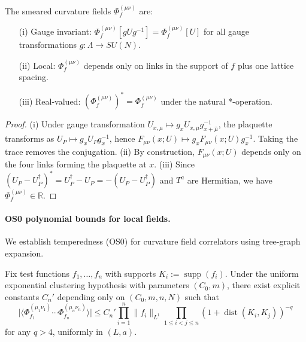 \documentclass[11pt]{amsart}
\begin{document}
\begin{proposition}\label{prop:curvature-local}
The smeared curvature fields $\Phi_f^{(\mu\nu)}$ are:
\begin{itemize}
  \item[(i)] Gauge invariant: $\Phi_f^{(\mu\nu)}[gUg^{-1}] = \Phi_f^{(\mu\nu)}[U]$ for all gauge transformations $g:\Lambda\to SU(N)$.
  \item[(ii)] Local: $\Phi_f^{(\mu\nu)}$ depends only on links in the support of $f$ plus one lattice spacing.
  \item[(iii)] Real-valued: $(\Phi_f^{(\mu\nu)})^* = \Phi_f^{(\mu\nu)}$ under the natural *-operation.
\end{itemize}
\end{proposition}

\begin{proof}
(i) Under gauge transformation $U_{x,\mu} \mapsto g_x U_{x,\mu} g_{x+\hat\mu}^{-1}$, the plaquette transforms as $U_P \mapsto g_x U_P g_x^{-1}$, hence $F_{\mu\nu}(x;U) \mapsto g_x F_{\mu\nu}(x;U) g_x^{-1}$. Taking the trace removes the conjugation.
(ii) By construction, $F_{\mu\nu}(x;U)$ depends only on the four links forming the plaquette at $x$.
(iii) Since $(U_P - U_P^\dagger)^* = U_P^\dagger - U_P = -(U_P - U_P^\dagger)$ and $T^a$ are Hermitian, we have $\Phi_f^{(\mu\nu)} \in \mathbb{R}$.
\end{proof}

\paragraph{OS0 polynomial bounds for local fields.}
We establish temperedness (OS0) for curvature field correlators using tree-graph expansion.

\begin{theorem}\label{thm:os0-curvature}
Fix test functions $f_1,\ldots,f_n$ with supports $K_i := \operatorname{supp}(f_i)$. Under the uniform exponential clustering hypothesis with parameters $(C_0,m)$, there exist explicit constants $C_n'$ depending only on $(C_0,m,n,N)$ such that
\[
  \bigl|\langle \Phi_{f_1}^{(\mu_1\nu_1)} \cdots \Phi_{f_n}^{(\mu_n\nu_n)} \rangle\bigr| \le C_n' \prod_{i=1}^n \|f_i\|_{L^1} \prod_{1\le i<j\le n} (1+\operatorname{dist}(K_i,K_j))^{-q}
\]
for any $q > 4$, uniformly in $(L,a)$.
\end{theorem}
\end{document}
